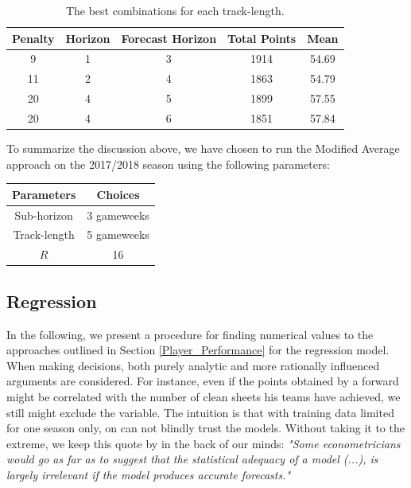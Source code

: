 \begin{table}[H]
\centering
\begin{tabular}{|c|c|c|c|c|}
\hline
Penalty & Horizon & Forecast Horizon & Total Points & Mean  \\
\hline
9       & 1       & 3                & 1914         & 54.69 \\
11      & 2       & 4                & 1863         & 54.79 \\
20      & 4       & 5                & 1899         & 57.55 \\
20      & 4       & 6                & 1851         & 57.84 \\
\hline
\end{tabular}
\caption{The best combinations for each track-length.}
\label{tab:top_5}
\end{table}


\newpar
To summarize the discussion above, we have chosen to run the Modified Average approach on the 2017/2018 season using the following parameters:

\begin{table}[H]
    \centering
    \begin{tabular}{|c|c|}
    \hline
    Parameters      &   Choices \\
    \hline
    Sub-horizon     &   3 gameweeks \\
    Track-length    &   5 gameweeks \\ 
    $R$             &   16 \\ 
    \hline
    \end{tabular}
\end{table}

\subsection{Regression}\label{exp_setup_reg}

In the following, we present a procedure for finding numerical values to the approaches outlined in Section \ref{Player_Performance} for the regression model. When making decisions, both purely analytic and more rationally influenced arguments are considered. For instance, even if the points obtained by a forward might be correlated with the number of clean sheets his teams have achieved, we still might exclude the variable. The intuition is that with training data limited for one season only, on can not blindly trust the models. Without taking it to the extreme, we keep this quote by \cite{brooks} in the back of our minds: \textit{"Some econometricians would go as far as to suggest that the statistical adequacy of a model (...), is largely irrelevant if the model produces accurate forecasts."}

